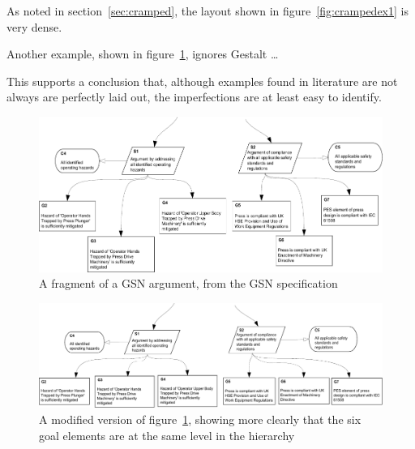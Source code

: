 \begin{itemize*}
\item As noted in section~\ref{sec:cramped}, the layout shown in figure~\ref{fig:crampedex1} is very dense.
\item Another example, shown in figure~\ref{fig:unalignedsiblings}, ignores  Gestalt \ldots
\end{itemize*}

This supports a conclusion that, although examples found in literature are not always are perfectly laid out, the imperfections are at least easy to identify.

\begin{figure}
    \includegraphics[width=\textwidth]{graphics/unaligned_siblings.pdf}
    \caption{A fragment of a GSN argument,
            from the GSN specification \citep[figure~42, section~2.3.6.5, pp.~34]{gsnstandard}}
    \label{fig:unalignedsiblings}
\end{figure}

\begin{figure}
    \includegraphics[width=\textwidth]{graphics/aligned_siblings.pdf}
    \caption{A modified version of figure~\ref{fig:unalignedsiblings},
            showing more clearly that the six goal elements are at the same level in the hierarchy
            }
    \label{fig:alignedsiblings}
\end{figure}



